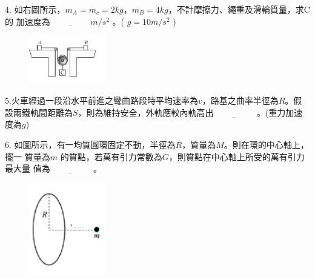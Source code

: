 \documentclass[cn,10pt,math=newtx,chinesefont=founder,device=ig]{elegantbook}
\begin{document}
\begin{example}
  4. 如右圖所示，$m_A = m_c = 2 kg$，$m_B = 4 kg$，不計摩擦力、繩重及滑輪質量，求C 的
加速度為$\underline{\hspace{2cm}} m/s^2$ 。( $g= 10 m/s^2$ ) \\
    \rightline{[中壢高中教甄109]}
\end{example}
\begin{solution}
    
\end{solution}
\begin{figure}[htbp]
    \flushright
    \includegraphics[width=0.3\textwidth]{image/109中壢4.png}
  \end{figure}
\newpage


\begin{example}
   5.火車經過一段沿水平前進之彎曲路段時平均速率為$v$，路基之曲率半徑為$R$。假設兩鐵軌間距離為$S$，則為維持安全，外軌應較內軌高出$\underline{\hspace{2cm}}$ 。(重力加速度為$g$)\\
    \rightline{[中壢高中教甄109]}
\end{example}
\begin{solution}
    
\end{solution}

\newpage

\begin{example}
   6. 如圖所示，有一均質圓環固定不動，半徑為$R$，質量為$M$。則在環的中心軸上，擺一
質量為$m$ 的質點，若萬有引力常數為$G$，則質點在中心軸上所受的萬有引力最大量
值為$\underline{\hspace{2cm}}$ 。\\
    \rightline{[中壢高中教甄109]}
\end{example}
\begin{solution}
    
\end{solution}
\begin{figure}[htbp]
    \flushright
    \includegraphics[width=0.3\textwidth]{image/109中壢6.png}
  \end{figure}
\newpage
\end{document}
